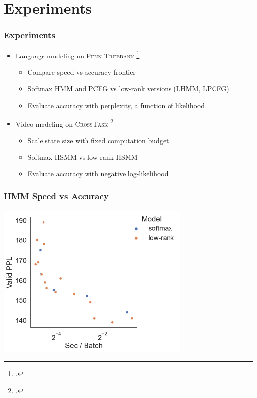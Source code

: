 \documentclass{beamer}
\begin{document}
\section{Experiments}

\begin{frame}
\frametitle{Experiments}
\begin{itemize}
\item Language modeling on \textsc{Penn Treebank} \footcite{ptb}
    \begin{itemize}
    \item Compare speed vs accuracy frontier
    \item Softmax HMM and PCFG vs low-rank versions (LHMM, LPCFG)
    \item Evaluate accuracy with perplexity, a function of likelihood
    \end{itemize}
\vspace{2em}
\item Video modeling on \textsc{CrossTask} \footcite{zhukov2019cross}
    \begin{itemize}
    \item Scale state size with fixed computation budget
    \item Softmax HSMM vs low-rank HSMM
    \item Evaluate accuracy with negative log-likelihood
    \end{itemize}
\end{itemize}
\end{frame}

\begin{frame}
\frametitle{HMM Speed vs Accuracy}
\centering
\includegraphics[height=3in]{imgs/hmm/lhmm-speed-accuracy.png}
\end{frame}
\end{document}
